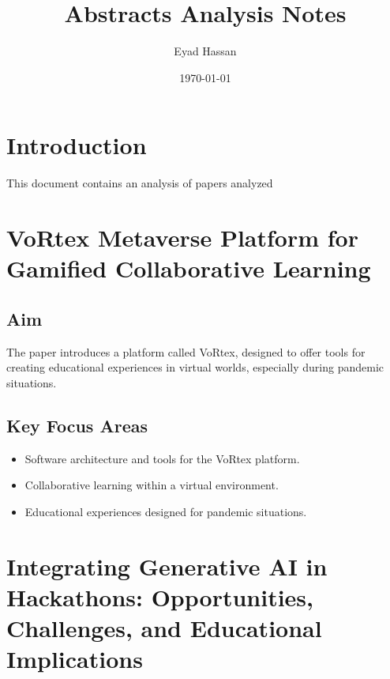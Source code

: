 \documentclass{article}
\title{Abstracts Analysis Notes}
\author{Eyad Hassan}
\date{\today}
\begin{document}
\maketitle

\section{Introduction}
This document contains an analysis of papers analyzed

\newpage


\newpage


\newpage


\newpage


\newpage


\newpage


\newpage
\section{VoRtex Metaverse Platform for Gamified Collaborative Learning}

\subsection{Aim}
The paper introduces a platform called VoRtex, designed to offer tools for creating educational experiences in virtual worlds, especially during pandemic situations.

\subsection{Key Focus Areas}
\begin{itemize}
    \item Software architecture and tools for the VoRtex platform.
    \item Collaborative learning within a virtual environment.
    \item Educational experiences designed for pandemic situations.
\end{itemize}

\newpage
\section{Integrating Generative AI in Hackathons: Opportunities, Challenges, and Educational Implications}
\end{document}
